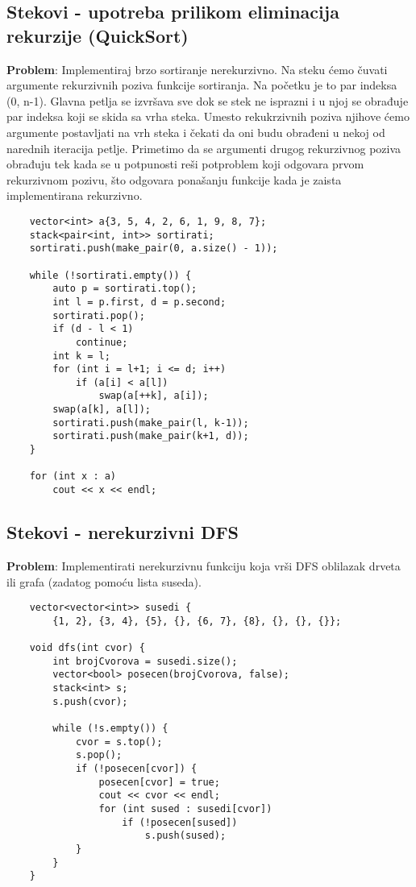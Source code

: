 \documentclass{article}
\begin{document}
\subsection{Stekovi - upotreba prilikom eliminacija rekurzije (QuickSort)}
\newline \textbf{Problem}: Implementiraj brzo sortiranje nerekurzivno.
\newline Na steku ćemo čuvati argumente rekurzivnih poziva funkcije sortiranja. Na početku je to par indeksa (0, n-1). Glavna petlja se izvršava sve dok se stek ne
isprazni i u njoj se obrađuje par indeksa koji se skida sa vrha steka. Umesto
rekukrzivnih poziva njihove ćemo argumente postavljati na vrh steka i čekati
da oni budu obrađeni u nekoj od narednih iteracija petlje. Primetimo da se
argumenti drugog rekurzivnog poziva obrađuju tek kada se u potpunosti reši
potproblem koji odgovara prvom rekurzivnom pozivu, što odgovara ponašanju
funkcije kada je zaista implementirana rekurzivno.
\begin{lstlisting}
    vector<int> a{3, 5, 4, 2, 6, 1, 9, 8, 7};
    stack<pair<int, int>> sortirati;
    sortirati.push(make_pair(0, a.size() - 1));
    
    while (!sortirati.empty()) {
        auto p = sortirati.top();
        int l = p.first, d = p.second;
        sortirati.pop();
        if (d - l < 1)
            continue;
        int k = l;
        for (int i = l+1; i <= d; i++)
            if (a[i] < a[l])
                swap(a[++k], a[i]);
        swap(a[k], a[l]);
        sortirati.push(make_pair(l, k-1));
        sortirati.push(make_pair(k+1, d));
    }
    
    for (int x : a)
        cout << x << endl;
\end{lstlisting}

\subsection{Stekovi - nerekurzivni DFS}
\textbf{Problem}: Implementirati nerekurzivnu funkciju koja vrši DFS oblilazak drveta ili grafa (zadatog pomoću lista suseda).\newpage
\begin{lstlisting}
    vector<vector<int>> susedi {
        {1, 2}, {3, 4}, {5}, {}, {6, 7}, {8}, {}, {}, {}};

    void dfs(int cvor) {
        int brojCvorova = susedi.size();
        vector<bool> posecen(brojCvorova, false);
        stack<int> s;
        s.push(cvor);
        
        while (!s.empty()) {
            cvor = s.top();
            s.pop();
            if (!posecen[cvor]) {
                posecen[cvor] = true;
                cout << cvor << endl;
                for (int sused : susedi[cvor])
                    if (!posecen[sused])
                        s.push(sused);
            }
        }
    }
\end{lstlisting}
\end{document}
